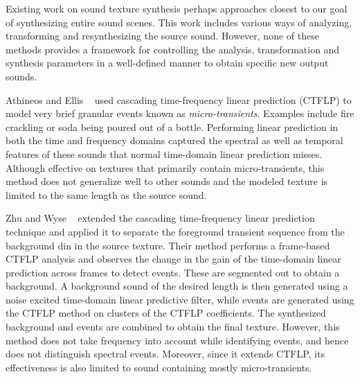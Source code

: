 \documentclass{acmsiggraph}               %
\begin{document}
Existing work on sound texture synthesis perhaps approaches closest to our 
goal of synthesizing entire sound scenes. This work includes various ways of 
analyzing, transforming and resynthesizing the source sound. However, none of these 
methods provides a framework for controlling the analysis, transformation and 
synthesis parameters in a well-defined manner to obtain specific new output sounds.

Athineos and Ellis ~ used cascading time-frequency 
linear prediction (CTFLP) to model very brief granular events known as 
\textit{micro-transients}. Examples include fire crackling or soda being 
poured out of a bottle. Performing linear prediction in both the time and 
frequency domains captured the spectral as well as temporal features of these 
sounds that normal time-domain linear prediction misses.
Although effective on textures that primarily contain micro-transients, 
this method does not generalize well to other sounds and the modeled 
texture is limited to the same length as the source sound.

Zhu and Wyse ~ extended the cascading time-frequency 
linear prediction technique and applied it to separate the foreground 
transient sequence from the background din in the source texture. Their 
method performs a frame-based CTFLP analysis and observes the change in 
the gain of the time-domain linear prediction across frames to detect 
events. These are segmented out to obtain a background. 
A background sound of the desired length is then generated using a noise 
excited time-domain linear predictive filter, while events are generated 
using the CTFLP method on clusters of the CTFLP coefficients. The 
synthesized background and events are combined to obtain the final texture. 
However, this method does not take frequency into account while 
identifying events, and hence does not distinguish spectral events. 
Moreover, since it extends CTFLP, its effectiveness is also limited to 
sound containing mostly micro-transients.
\end{document}
